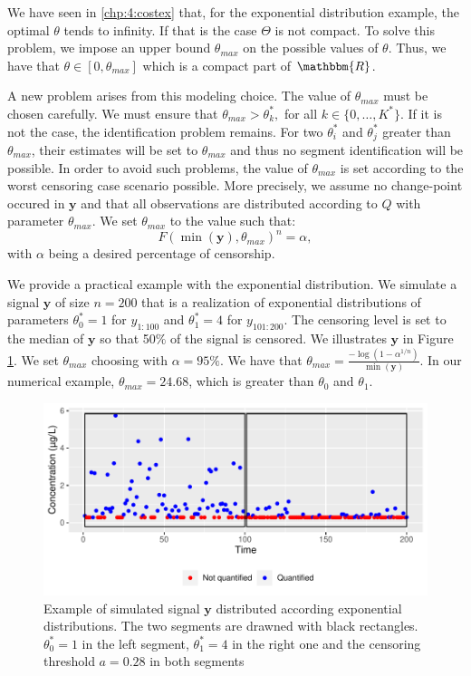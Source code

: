 We have seen in \ref{chp:4:costex} that, for the exponential distribution example, the optimal $\theta$ tends to infinity. If that is the case $\Theta$ is not compact. To solve this problem, we impose an upper bound $\theta_{max}$ on the possible values of $\theta$. Thus, we have that $\theta \in [0,\theta_{max}]$ which is a compact part of $\mathbbm{R}$. 

A new problem arises from this modeling choice. The value of $\theta_{max}$ must be chosen carefully. We must ensure that $\theta_{max}> \theta^*_k,$ for all $k \in \{0,\dots,K^*\}$. If it is not the case, the identification problem remains. For two $\theta^*_i$ and $\theta^*_j$    greater than $\theta_{max}$, their estimates will be set to $\theta_{max}$ and thus no segment identification will be possible. In order to avoid such problems, the value of $\theta_{max}$ is set according to the worst censoring case scenario possible. More precisely, we assume no change-point occured in $\bm y$ and that all observations are distributed according to $Q$ with parameter $\theta_{max}$. We set $\theta_{max}$ to the value such that: 
$$F(\min(\bm y),\theta_{max})^n = \alpha,$$
with $\alpha$ being a desired percentage of censorship. 

We provide a practical example with the exponential distribution. We simulate a signal $\bm y$ of size $n = 200$ that is a realization of exponential distributions of parameters $\theta^*_0 = 1$ for $y_{1:100}$ and $\theta^*_1 = 4$ for $y_{101:200}$. The censoring level is set to the median of $\bm y$ so that 50$\%$ of the signal is censored. We illustrates $\bm y$ in Figure \ref{fig:theta_max}. We set $\theta_{max}$ choosing with $\alpha = 95\%$. We have that $\theta_{max} = \frac{-\log(1-\alpha^{1/n})}{\min(\bm y)}$. In our numerical example, $\theta_{max} = 24.68$, which is greater than $\theta_0$ and $\theta_1$.

\begin{figure}[ht]
    \centering
    \includegraphics{figs/Chap4/theta_max_ex.pdf}
    \caption{Example of simulated signal $\bm y$ distributed according exponential distributions. The two segments are drawned with black rectangles. $\theta^*_0 = 1$ in the left segment, $\theta^*_1 = 4$ in the right one and the censoring threshold $a = 0.28$ in both segments}
    \label{fig:theta_max}
\end{figure}

